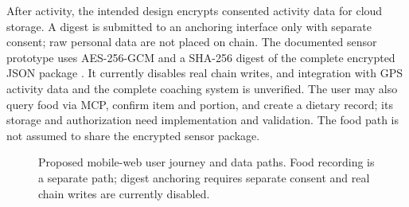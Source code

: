 After activity, the intended design encrypts consented activity data for cloud storage. A digest is submitted to an anchoring interface only with separate consent; raw personal data are not placed on chain. The documented sensor prototype uses AES-256-GCM and a SHA-256 digest of the complete encrypted JSON package \cite{blockchain}. It currently disables real chain writes, and integration with GPS activity data and the complete coaching system is unverified. The user may also query food via MCP, confirm item and portion, and create a dietary record; its storage and authorization need implementation and validation. The food path is not assumed to share the encrypted sensor package.

\begin{figure}[t]
\centering
{}
\caption{Proposed mobile-web user journey and data paths. Food recording is a separate path; digest anchoring requires separate consent and real chain writes are currently disabled.}
\label{fig:architecture}
\end{figure}

